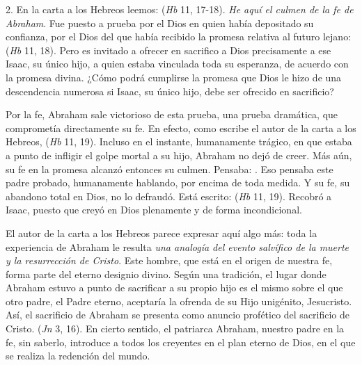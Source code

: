 \begin{body}
2. En la carta a los Hebreos leemos:  (\textit{Hb} 11, 17-18). \textit{He aquí el culmen de la fe de Abraham}. Fue puesto a prueba por el Dios en quien había depositado su confianza, por el Dios del que había recibido la promesa relativa al futuro lejano:  (\textit{Hb} 11, 18). Pero es invitado a ofrecer en sacrifico a Dios precisamente a ese Isaac, su único hijo, a quien estaba vinculada toda su esperanza, de acuerdo con la promesa divina. ¿Cómo podrá cumplirse la promesa que Dios le hizo de una descendencia numerosa si Isaac, su único hijo, debe ser ofrecido en sacrificio?

Por la fe, Abraham sale victorioso de esta prueba, una prueba dramática, que comprometía directamente su fe. En efecto, como escribe el autor de la carta a los Hebreos,  (\textit{Hb} 11, 19). Incluso en el instante, humanamente trágico, en que estaba a punto de infligir el golpe mortal a su hijo, Abraham no dejó de creer. Más aún, su fe en la promesa alcanzó entonces su culmen. Pensaba: . Eso pensaba este padre probado, humanamente hablando, por encima de toda medida. Y su fe, su abandono total en Dios, no lo defraudó. Está escrito:  (\textit{Hb} 11, 19). Recobró a Isaac, puesto que creyó en Dios plenamente y de forma incondicional.

El autor de la carta a los Hebreos parece expresar aquí algo más: toda la experiencia de Abraham le resulta \textit{una analogía del evento salvífico de la muerte y la resurrección de Cristo}. Este hombre, que está en el origen de nuestra fe, forma parte del eterno designio divino. Según una tradición, el lugar donde Abraham estuvo a punto de sacrificar a su propio hijo es el mismo sobre el que otro padre, el Padre eterno, aceptaría la ofrenda de su Hijo unigénito, Jesucristo. Así, el sacrificio de Abraham se presenta como anuncio profético del sacrificio de Cristo.  (\textit{Jn} 3, 16). En cierto sentido, el patriarca Abraham, nuestro padre en la fe, sin saberlo, introduce a todos los creyentes en el plan eterno de Dios, en el que se realiza la redención del mundo.


\end{body}
